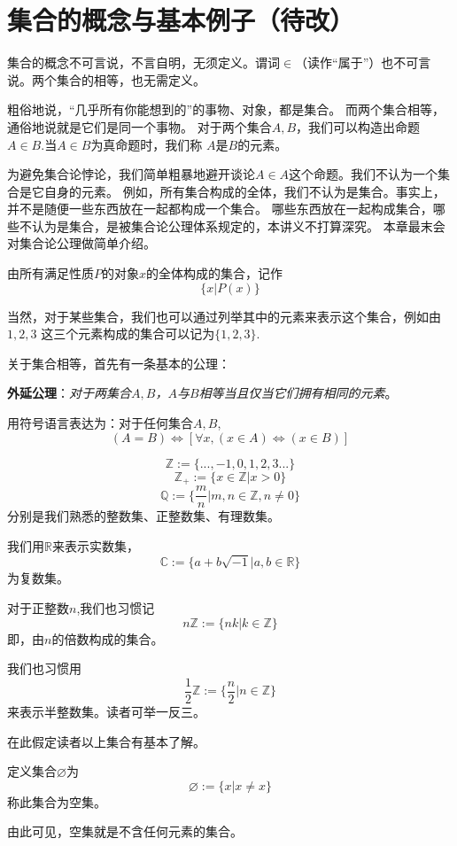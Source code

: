 
\section{集合的概念与基本例子（待改）}
\begin{definition}
集合的概念不可言说，不言自明，无须定义。谓词$\in$（读作“属于”）也不可言说。两个集合的相等，也无需定义。
\end{definition}
粗俗地说，“几乎所有你能想到的”的事物、对象，都是集合。
而两个集合相等，通俗地说就是它们是同一个事物。
对于两个集合$A,B$，我们可以构造出命题$A\in B$.当$A\in B$为真命题时，我们称
$A$是$B$的元素。

为避免集合论悖论，我们简单粗暴地避开谈论$A\in A$这个命题。我们不认为一个集合是它自身的元素。
例如，所有集合构成的全体，我们不认为是集合。事实上，并不是随便一些东西放在一起都构成一个集合。
哪些东西放在一起构成集合，哪些不认为是集合，是被集合论公理体系规定的，本讲义不打算深究。
本章最末会对集合论公理做简单介绍。\vs

由所有满足性质$P$的对象$x$的全体构成的集合，记作
$$\{x|P(x)\}$$

当然，对于某些集合，我们也可以通过列举其中的元素来表示这个集合，例如由$1,2,3$
这三个元素构成的集合可以记为$\{1,2,3\}$.

关于集合相等，首先有一条基本的公理：\vs

\textbf{外延公理}：\emph{对于两集合$A,B$，$A$与$B$相等当且仅当它们拥有相同的元素}。

用符号语言表达为：对于任何集合$A,B$,
$$(A=B)\Leftrightarrow[\forall x,(x\in A)\Leftrightarrow(x\in B)]$$

\begin{example}[常见的集合及其记号]
$$\mathbb{Z}:=\{...,-1,0,1,2,3...\}$$
$$\mathbb{Z_+}:=\{x\in\mathbb{Z}|x>0\}$$
$$\mathbb{Q}:=\{\frac{m}{n}|m,n\in\mathbb{Z},n\neq0\}$$
分别是我们熟悉的整数集、正整数集、有理数集。
\end{example}
我们用$\mathbb{R}$来表示实数集，
$$\mathbb{C}:=\{a+b\sqrt{-1}|a,b\in\mathbb{R}\}$$
为复数集。

\begin{example}对于正整数$n$,我们也习惯记
$$n\mathbb{Z}:=\{nk|k\in\mathbb{Z}\}$$
即，由$n$的倍数构成的集合。
\end{example}

我们也习惯用
$$\frac{1}{2}\mathbb{Z}:=\{\frac{n}{2}|n\in\mathbb{Z}\}$$
来表示半整数集。读者可举一反三。

在此假定读者以上集合有基本了解。

\begin{definition}[空集]
定义集合$\varnothing$为
$$\varnothing:=\{x|x\neq x\}$$
称此集合为空集。
\end{definition}
由此可见，空集就是不含任何元素的集合。


